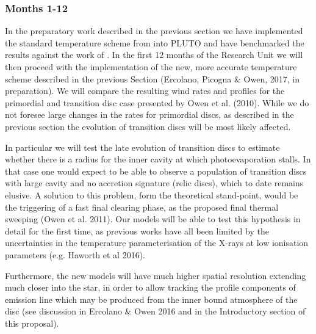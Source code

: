 \documentclass[10pt,fleqn,twoside]{article}
\begin{document}
\subsubsection{Months 1-12}
In the preparatory work described in the previous section we have
implemented the standard temperature scheme from 
\citet{2008ApJ...688..398E, 2009ApJ...699.1639E}
into PLUTO and have benchmarked the results against
the work of 
\citet{2010MNRAS.401.1415O}.
In the first 12 months of the Research
Unit we will then proceed with the implementation of the new, more accurate
temperature scheme described in the previous Section (Ercolano,
Picogna \& Owen, 2017, in preparation). We will compare the resulting
wind rates and profiles for the primordial and transition disc
case presented by Owen et al. (2010). While we do not foresee large
changes in the rates for primordial discs, as described in the
previous section the evolution of transition discs will be most 
likely affected. 

In particular we will test the late evolution of transition discs to
estimate whether there is a radius for the inner cavity at which
photoevaporation stalls. In that case one would expect to be able to
observe a population of transition discs with large cavity and no
accretion signature (relic discs), which to date remains elusive. A solution to this
problem, form the theoretical stand-point, would be the triggering of
a fast final clearing phase, as the proposed final thermal sweeping
(Owen et al. 2011). Our models will be able to test this hypothesis in
detail for the first time, as previous works have all been limited by
the uncertainties in the temperature parameterisation of the X-rays at
low ionisation parameters (e.g. Haworth et al 2016). 

Furthermore, the new models will have much higher spatial
resolution extending much closer into the star, in order to allow
tracking the profile components of emission line which may be produced from the inner bound
atmosphere of the disc (see discussion in Ercolano \& Owen 2016 and in
the Introductory section of this proposal).

\end{document}
